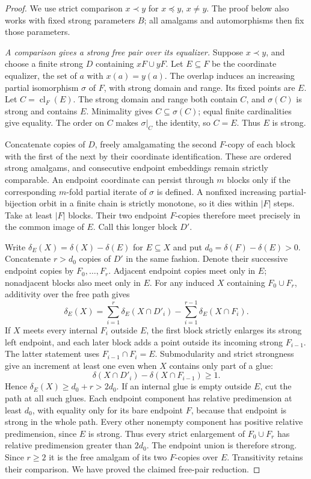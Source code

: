 \begin{proof}
We use strict comparison $x\prec y$ for $x\preceq y$, $x\ne y$.
The proof below also works with fixed strong parameters $B$;
all amalgams and automorphisms then fix those parameters.

\emph{A comparison gives a strong free pair over its equalizer.}
Suppose $x\prec y$, and choose a finite strong $D$ containing
$xF\cup yF$. Let $E\subseteq F$ be the coordinate equalizer,
the set of $a$ with $x(a)=y(a)$. The overlap induces an
increasing partial isomorphism $\sigma$ of $F$, with strong
domain and range. Its fixed points are $E$. Let
$C=\operatorname{cl}_F(E)$. The strong domain and range both
contain $C$, and $\sigma(C)$ is strong and contains $E$.
Minimality gives $C\subseteq\sigma(C)$; equal finite cardinalities
give equality. The order on $C$ makes $\sigma|_C$ the identity,
so $C=E$. Thus $E$ is strong.

Concatenate copies of $D$, freely amalgamating the second
$F$-copy of each block with the first of the next by their
coordinate identification. These are ordered strong amalgams,
and consecutive endpoint embeddings remain strictly comparable.
An endpoint coordinate can persist through $m$ blocks only if
the corresponding $m$-fold partial iterate of $\sigma$ is defined.
A nonfixed increasing partial-bijection orbit in a finite chain
is strictly monotone, so it dies within $|F|$ steps. Take at
least $|F|$ blocks. Their two endpoint $F$-copies therefore
meet precisely in the common image of $E$. Call this longer
block $D'$.

Write $\delta_E(X)=\delta(X)-\delta(E)$ for $E\subseteq X$
and put $d_0=\delta(F)-\delta(E)>0$. Concatenate $r>d_0$
copies of $D'$ in the same fashion. Denote their successive
endpoint copies by $F_0,\ldots,F_r$. Adjacent endpoint copies
meet only in $E$; nonadjacent blocks also meet only in $E$.
For any induced $X$ containing $F_0\cup F_r$, additivity over
the free path gives
\[
 \delta_E(X)=\sum_{i=1}^{r}\delta_E(X\cap D'_i)
       -\sum_{i=1}^{r-1}\delta_E(X\cap F_i).
 \tag{G.24}
\]
If $X$ meets every internal $F_i$ outside $E$, the first block
strictly enlarges its strong left endpoint, and each later
block adds a point outside its incoming strong $F_{i-1}$.
The latter statement uses $F_{i-1}\cap F_i=E$.
Submodularity and strict strongness give an increment at
least one even when $X$ contains only part of a glue:
\[
 \delta(X\cap D'_i)-\delta(X\cap F_{i-1})\ge1.
\]
Hence $\delta_E(X)\ge d_0+r>2d_0$.
If an internal glue is empty outside $E$, cut the path at all
such glues. Each endpoint component has relative predimension
at least $d_0$, with equality only for its bare endpoint $F$,
because that endpoint is strong in the whole path. Every
other nonempty component has positive relative predimension,
since $E$ is strong. Thus every strict enlargement of
$F_0\cup F_r$ has relative predimension greater than $2d_0$.
The endpoint union is therefore strong. Since $r\ge2$ it is
the free amalgam of its two $F$-copies over $E$.
Transitivity retains their comparison. We have proved the
claimed free-pair reduction.


\end{proof}
